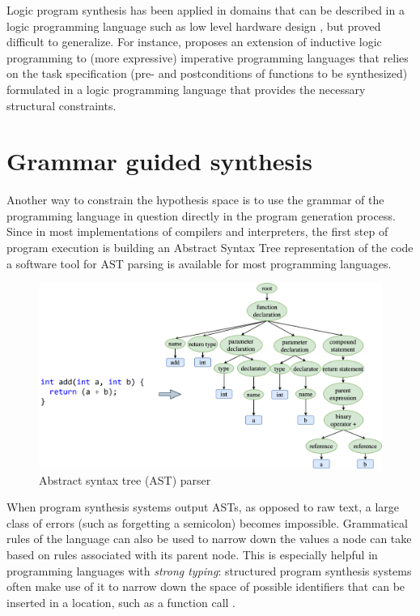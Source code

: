 Logic program synthesis has been applied in domains that can be described in a logic programming language such as low level hardware design \cite{siscoControlLogicSynthesis2024}, but proved difficult to generalize. 
For instance, \cite{polikarpovaStructuringSynthesisHeapmanipulating2019} proposes an extension of inductive logic programming to (more expressive) imperative programming languages that relies on the task specification (pre- and postconditions of functions to be synthesized) formulated in a logic programming language that provides the necessary structural constraints.

\newpage
\section{Grammar guided synthesis}
\label{sec:grammar-guided}

Another way to constrain the hypothesis space is to use the grammar of the programming language in question directly in the program generation process.
Since in most implementations of compilers and interpreters, the first step of program execution is building an Abstract Syntax Tree representation of the code a software tool for AST parsing is available for most programming languages.

\begin{figure}
    \centering
    \includegraphics[width=\linewidth]{images/ast.png}
    \caption{Abstract syntax tree (AST) parser}
    \label{fig:ast-parser}
\end{figure}

When program synthesis systems output ASTs, as opposed to raw text, a large class of errors (such as forgetting a semicolon) becomes impossible. 
Grammatical rules of the language can also be used to narrow down the values a node can take based on rules associated with its parent node.
This is especially helpful in programming languages with \emph{strong typing}: structured program synthesis systems often make use of it to narrow down the space of possible identifiers that can be inserted in a location, such as a function call \cite{fengComponentbasedSynthesisComplex2017, guoProgramSynthesisTypeguided2020, oseraConstraintbasedTypedirectedProgram2019, peter-michaelProgramSynthesisTypes2015, polikarpovaProgramSynthesisPolymorphic2016}.

